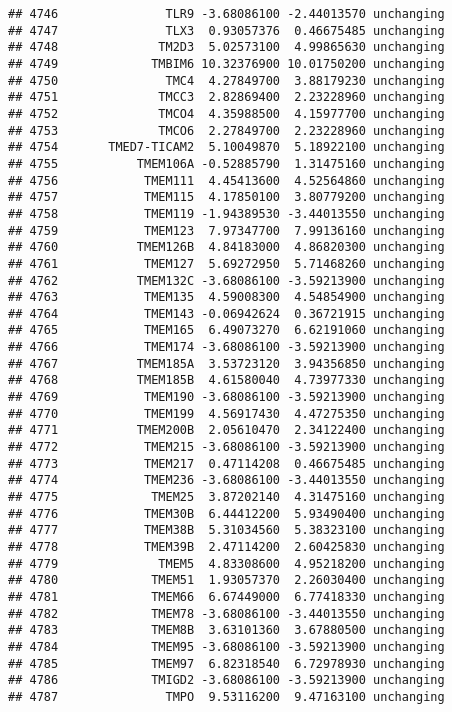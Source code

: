 \documentclass[]{article}
\begin{document}
\begin{verbatim}
## 4746               TLR9 -3.68086100 -2.44013570 unchanging
## 4747               TLX3  0.93057376  0.46675485 unchanging
## 4748              TM2D3  5.02573100  4.99865630 unchanging
## 4749             TMBIM6 10.32376900 10.01750200 unchanging
## 4750               TMC4  4.27849700  3.88179230 unchanging
## 4751              TMCC3  2.82869400  2.23228960 unchanging
## 4752              TMCO4  4.35988500  4.15977700 unchanging
## 4753              TMCO6  2.27849700  2.23228960 unchanging
## 4754       TMED7-TICAM2  5.10049870  5.18922100 unchanging
## 4755           TMEM106A -0.52885790  1.31475160 unchanging
## 4756            TMEM111  4.45413600  4.52564860 unchanging
## 4757            TMEM115  4.17850100  3.80779200 unchanging
## 4758            TMEM119 -1.94389530 -3.44013550 unchanging
## 4759            TMEM123  7.97347700  7.99136160 unchanging
## 4760           TMEM126B  4.84183000  4.86820300 unchanging
## 4761            TMEM127  5.69272950  5.71468260 unchanging
## 4762           TMEM132C -3.68086100 -3.59213900 unchanging
## 4763            TMEM135  4.59008300  4.54854900 unchanging
## 4764            TMEM143 -0.06942624  0.36721915 unchanging
## 4765            TMEM165  6.49073270  6.62191060 unchanging
## 4766            TMEM174 -3.68086100 -3.59213900 unchanging
## 4767           TMEM185A  3.53723120  3.94356850 unchanging
## 4768           TMEM185B  4.61580040  4.73977330 unchanging
## 4769            TMEM190 -3.68086100 -3.59213900 unchanging
## 4770            TMEM199  4.56917430  4.47275350 unchanging
## 4771           TMEM200B  2.05610470  2.34122400 unchanging
## 4772            TMEM215 -3.68086100 -3.59213900 unchanging
## 4773            TMEM217  0.47114208  0.46675485 unchanging
## 4774            TMEM236 -3.68086100 -3.44013550 unchanging
## 4775             TMEM25  3.87202140  4.31475160 unchanging
## 4776            TMEM30B  6.44412200  5.93490400 unchanging
## 4777            TMEM38B  5.31034560  5.38323100 unchanging
## 4778            TMEM39B  2.47114200  2.60425830 unchanging
## 4779              TMEM5  4.83308600  4.95218200 unchanging
## 4780             TMEM51  1.93057370  2.26030400 unchanging
## 4781             TMEM66  6.67449000  6.77418330 unchanging
## 4782             TMEM78 -3.68086100 -3.44013550 unchanging
## 4783             TMEM8B  3.63101360  3.67880500 unchanging
## 4784             TMEM95 -3.68086100 -3.59213900 unchanging
## 4785             TMEM97  6.82318540  6.72978930 unchanging
## 4786             TMIGD2 -3.68086100 -3.59213900 unchanging
## 4787               TMPO  9.53116200  9.47163100 unchanging

\end{verbatim}
\end{document}
